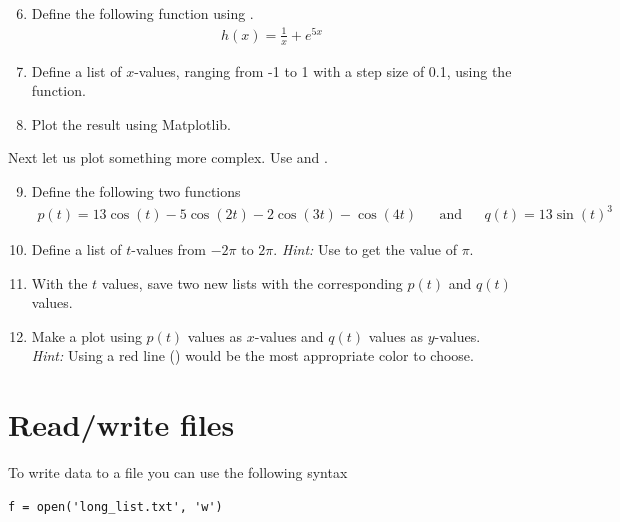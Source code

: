 \documentclass{article}
\begin{document}
\begin{enumerate}
  \setcounter{enumi}{5}
  \item Define the following function using .
    \begin{align}
        h(x) = \frac{1}{x} + e^{5x}
    \end{align}

  \item Define a list of $x$-values, ranging from -1 to 1 with a step size of 0.1, using the  function.

  \item Plot the result using Matplotlib.

\end{enumerate}

Next let us plot something more complex. Use  and .

\begin{enumerate}
    \setcounter{enumi}{8}
    \item Define the following two functions
    \begin{align}
         p(t) = 13\cos(t) - 5 \cos(2t) - 2 \cos(3t) - \cos(4t) && \text{and} && q(t) = 13\sin(t)^3 
    \end{align}

    \item Define a list of $t$-values from $-2\pi$ to $2\pi$.
      {\em Hint:} Use  to get the value of $\pi$.

    \item With the $t$ values, save two new lists with the corresponding $p(t)$ and $q(t)$ values.

    \item Make a plot using $p(t)$ values as $x$-values and $q(t)$ values as $y$-values.
        {\em Hint:} Using a red line () would be the most appropriate color to choose.


\end{enumerate}


\section{Read/write files}


To write data to a file you can use the following syntax
\begin{lstlisting}
f = open('long_list.txt', 'w')
\end{lstlisting}
\end{document}
